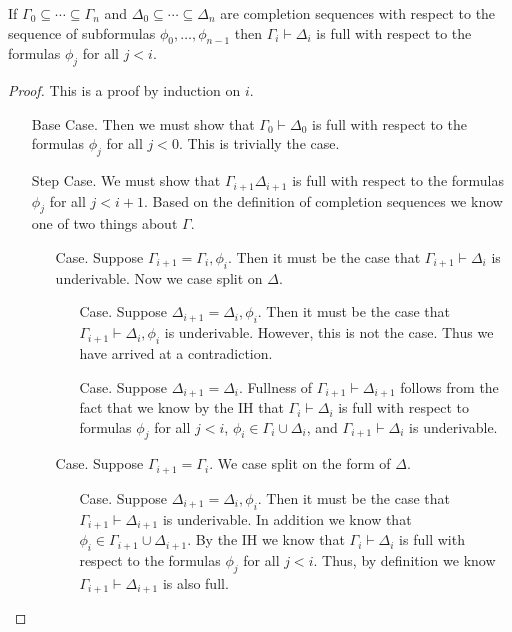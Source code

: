 \documentclass{article}
\begin{document}
\begin{lemma}
  \label{lemma:completion_aux}
  If $\Gamma_0 \subseteq \cdots \subseteq \Gamma_n$ and $\Delta_0 \subseteq \cdots \subseteq \Delta_n$ are
  completion sequences with respect to the sequence of subformulas $\phi_0, \ldots , \phi_{n-1}$ then 
  $\Gamma_i \vdash \Delta_i$ is full with respect to the formulas $\phi_j$ for all $j < i$.
\end{lemma}
\begin{proof}
  This is a proof by induction on $i$. 
  \begin{itemize}
  \item[Base Case.] Then we must show that $\Gamma_0 \vdash \Delta_0$ is full with respect to
    the formulas $\phi_j$ for all $j < 0$.  This is trivially the case.

  \item[Step Case.] We must show that $\Gamma_{i+1} \Delta_{i+1}$ is full with respect to the formulas
    $\phi_j$ for all $j < i+1$.  Based on the definition of completion sequences we know one of two things
    about $\Gamma$.
    \begin{itemize}
    \item[Case.] Suppose $\Gamma_{i+1} = \Gamma_i,\phi_i$.  Then it must be the case that 
      $\Gamma_{i+1} \vdash \Delta_{i}$ is underivable.  Now we case split on $\Delta$.
      \begin{itemize}
      \item[Case.] Suppose $\Delta_{i+1} = \Delta_i,\phi_i$.  Then it must be the case that 
        $\Gamma_{i+1} \vdash \Delta_i,\phi_i$ is underivable.  However, this is not the case.
        Thus we have arrived at a contradiction.

      \item[Case.] Suppose $\Delta_{i+1} = \Delta_{i}$.  Fullness of $\Gamma_{i+1} \vdash \Delta_{i+1}$
        follows from the fact that we know by the IH that $\Gamma_i \vdash \Delta_i$ is full with respect
        to formulas $\phi_j$ for all $j < i$, $\phi_i \in \Gamma_i \cup \Delta_i$, and $\Gamma_{i+1} \vdash \Delta_i$
        is underivable.
      \end{itemize}

    \item[Case.] Suppose $\Gamma_{i+1} = \Gamma_i$.  We case split on the form of $\Delta$.
      \begin{itemize}
      \item[Case.] Suppose $\Delta_{i+1} = \Delta_i,\phi_i$.  Then it must be the case that 
        $\Gamma_{i+1} \vdash \Delta_{i+1}$ is underivable.  In addition we know that 
        $\phi_i \in \Gamma_{i+1} \cup \Delta_{i+1}$.  By the IH we know that $\Gamma_i \vdash \Delta_i$ is
        full with respect to the formulas $\phi_j$ for all $j < i$.  Thus, by definition we know
        $\Gamma_{i+1} \vdash \Delta_{i+1}$ is also full.
        

\end{itemize}
\end{itemize}
\end{itemize}
\end{proof}
\end{document}
